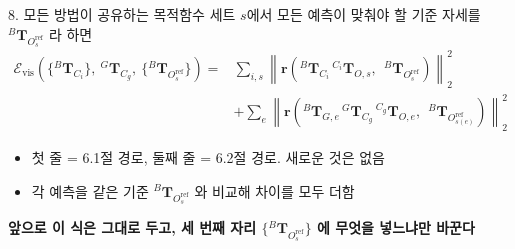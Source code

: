 \documentclass[aspectratio=169,11pt]{beamer}
\newcommand{\T}[3][]{{}^{#2}\mathbf{T}^{#1}_{#3}}   %
\newcommand{\Oref}{O^{\mathrm{ref}}}   %
\begin{document}
\begin{frame}{8. 모든 방법이 공유하는 목적함수}
  세트 $s$에서 모든 예측이 맞춰야 할 기준 자세를 $\T{B}{\Oref_s}$ 라 하면
  {\small
  \[
    \begin{aligned}
      \mathcal{E}_{\mathrm{vis}}
      \left(
        \{\T{B}{C_i}\},\ \T{G}{C_g},\ \{\T{B}{\Oref_s}\}
      \right)
      ={}&
      \sum_{i,s}
      \left\|
        \mathbf{r}\left(
          \T{B}{C_i}\,\T{C_i}{O,s},
          \ \ \T{B}{\Oref_s}
        \right)
      \right\|_2^2
      \\[4pt]
      &+
      \sum_e
      \left\|
        \mathbf{r}\left(
          \T{B}{G,e}\,\T{G}{C_g}\,\T{C_g}{O,e},
          \ \ \T{B}{\Oref_{s(e)}}
        \right)
      \right\|_2^2
    \end{aligned}
  \]
  }
  \vfill
  \begin{itemize}
    \item 첫 줄 = 6.1절 경로, 둘째 줄 = 6.2절 경로. 새로운 것은 없음
    \item 각 예측을 같은 기준 $\T{B}{\Oref_s}$ 와 비교해 차이를 모두 더함
  \end{itemize}
  \vfill
  \begin{alertblock}{}
    \centering
    \textbf{앞으로 이 식은 그대로 두고, 세 번째 자리
    $\{\T{B}{\Oref_s}\}$ 에 무엇을 넣느냐만 바꾼다}
  \end{alertblock}
\end{frame}
\end{document}
